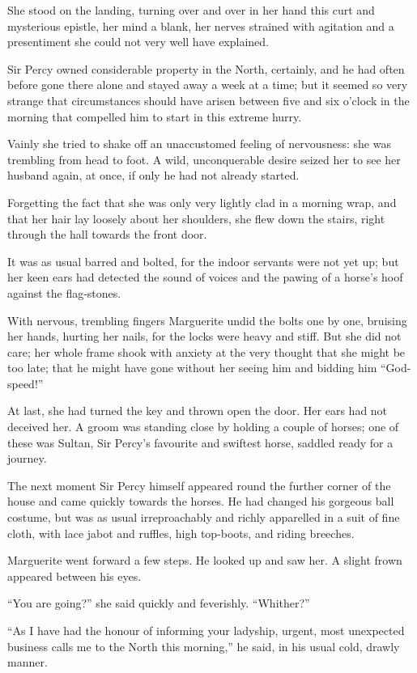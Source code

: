 \documentclass[paper=a5,BCOR=7mm,twoside,DIV=calc,12pt,usegeometry,chapterprefix,endperiod,headings=big]{scrbook}
\begin{document}
She stood on the landing, turning over and over in her hand this curt and mysterious epistle, her mind a blank, her nerves strained with agitation and a presentiment she could not very well have explained.

Sir Percy owned considerable property in the North, certainly, and he had often before gone there alone and stayed away a week at a time; but it seemed so very strange that circumstances should have arisen between five and six o'clock in the morning that compelled him to start in this extreme hurry.

Vainly she tried to shake off an unaccustomed feeling of nervousness: she was trembling from head to foot. A wild, unconquerable desire seized her to see her husband again, at once, if only he had not already started.

Forgetting the fact that she was only very lightly clad in a morning wrap, and that her hair lay loosely about her shoulders, she flew down the stairs, right through the hall towards the front door.

It was as usual barred and bolted, for the indoor servants were not yet up; but her keen ears had detected the sound of voices and the pawing of a horse's hoof against the flag-stones.

With nervous, trembling fingers Marguerite undid the bolts one by one, bruising her hands, hurting her nails, for the locks were heavy and stiff. But she did not care; her whole frame shook with anxiety at the very thought that she might be too late; that he might have gone without her seeing him and bidding him \enquote{God-speed!}

At last, she had turned the key and thrown open the door. Her ears had not deceived her. A groom was standing close by holding a couple of horses; one of these was Sultan, Sir Percy's favourite and swiftest horse, saddled ready for a journey.

The next moment Sir Percy himself appeared round the further corner of the house and came quickly towards the horses. He had changed his gorgeous ball costume, but was as usual irreproachably and richly apparelled in a suit of fine cloth, with lace jabot and ruffles, high top-boots, and riding breeches.

Marguerite went forward a few steps. He looked up and saw her. A slight frown appeared between his eyes.

\enquote{You are going?} she said quickly and feverishly. \enquote{Whither?}

\enquote{As I have had the honour of informing your ladyship, urgent, most unexpected business calls me to the North this morning,} he said, in his usual cold, drawly manner.
\end{document}
